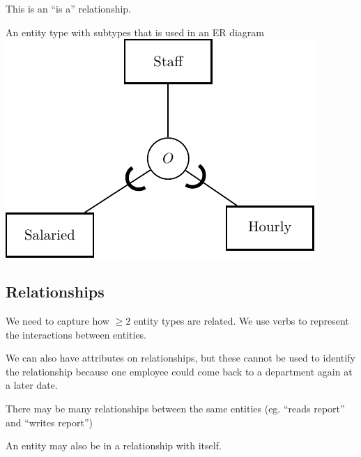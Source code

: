 \begin{note}
    This is an ``is a'' relationship.
\end{note}

\begin{highlight}{An entity type with subtypes that is used in an ER diagram}
    \includegraphics{lualatex/dsr/3/subtyping.pdf}
\end{highlight}

\subsection{Relationships}\label{sub:relationships}

We need to capture how \(\geq 2\) entity types are related.
We use verbs to represent the interactions between entities.

We can also have attributes on relationships, but these cannot be used to identify the relationship because one employee could come back to a department again at a later date.

There may be many relationships between the same entities (eg. ``reads report'' and ``writes report'')

An entity may also be in a relationship with itself.


